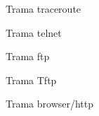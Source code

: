 \documentclass[11pt]{article}
\begin{document}
\begin{figure}[hbt!]
    \centering
    \caption{Trama traceroute}
\end{figure}

\begin{figure}[hbt!]
    \centering
    \caption{Trama telnet}
\end{figure}

\begin{figure}[hbt!]
    \centering
    \caption{Trama ftp}
\end{figure}

\begin{figure}[hbt!]
    \centering
    \caption{Trama Tftp}
\end{figure}

\begin{figure}[hbt!]
    \centering
    \caption{Trama browser/http}
\end{figure}
\end{document}

